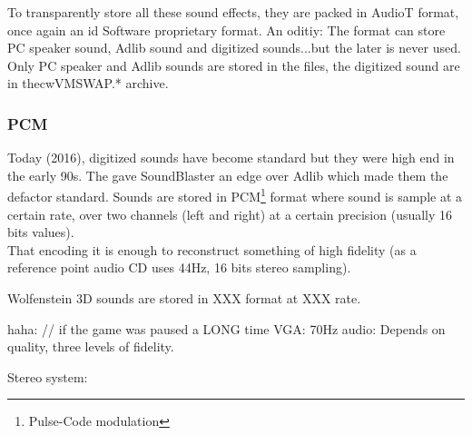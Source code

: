 \par
\begin{minipage}{\textwidth}

\end{minipage}
\par
To transparently store all these sound effects, they are packed in AudioT format, once again an id Software proprietary format. An oditiy: The format can store PC speaker sound, Adlib sound and digitized sounds...but the later is never used. Only PC speaker and Adlib sounds are stored in the  files, the digitized sound are in thecw{VMSWAP.*} archive.\\
\par





\subsubsection{PCM}
Today (2016), digitized sounds have become standard but they were high end in the early 90s. The gave SoundBlaster an edge over Adlib which made them the defactor standard. Sounds are stored in PCM\footnote{Pulse-Code modulation} format where sound is sample at a certain rate, over two channels (left and right) at a certain precision (usually 16 bits values).\\
That encoding it is enough to reconstruct something of high fidelity (as a reference point audio CD uses 44Hz, 16 bits stereo sampling).\\
\par

Wolfenstein 3D sounds are stored in XXX format at XXX rate.



haha: // if the game was paused a LONG time
VGA: 70Hz
audio: Depends on quality, three levels of fidelity.

\par
Stereo system:\\
\par

